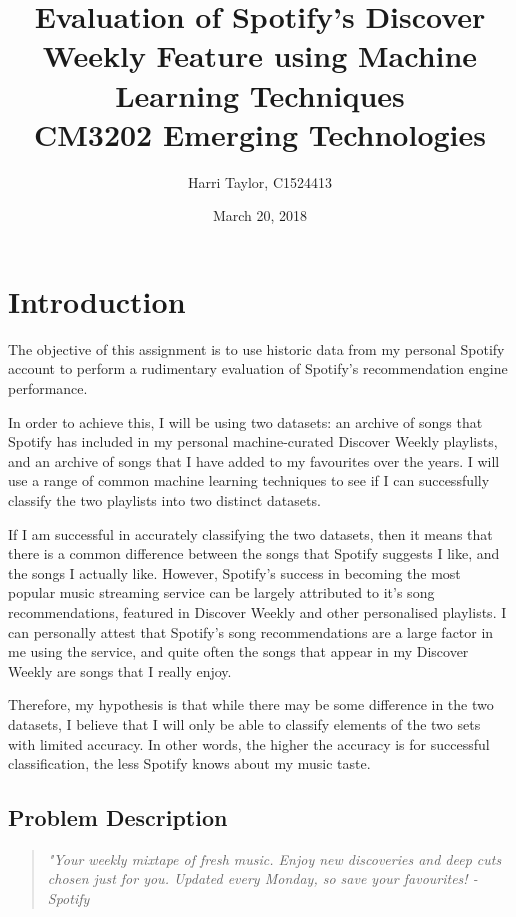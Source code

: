 \documentclass{article}
\title{
	Evaluation of Spotify's Discover Weekly Feature using Machine Learning Techniques \\ 
	\large CM3202 Emerging Technologies
	}
\author{Harri Taylor, C1524413}
\date{March 20, 2018}
\begin{document}
	\maketitle
	\newpage
	
	\section{Introduction}
	
	The objective of this assignment is to use historic data from my personal Spotify account to perform a rudimentary evaluation of Spotify's recommendation engine performance. 
	
	In order to achieve this, I will be using two datasets: an archive of songs that Spotify has included in my personal machine-curated Discover Weekly playlists, and an archive of songs that I have added to my favourites over the years. I will use a range of common machine learning techniques to see if I can successfully classify the two playlists into two distinct datasets. 
	
	If I am successful in accurately classifying the two datasets, then it means that there is a common difference between the songs that Spotify suggests I like, and the songs I actually like. However, Spotify's success in becoming the most popular music streaming service can be largely attributed to it's song recommendations, featured in Discover Weekly and other personalised playlists. I can personally attest that Spotify's song recommendations are a large factor in me using the service, and quite often the songs that appear in my Discover Weekly are songs that I really enjoy. 
	
	Therefore, my hypothesis is that while there may be some difference in the two datasets, I believe that I will only be able to classify elements of the two sets with limited accuracy. In other words, the higher the accuracy is for successful classification, the less Spotify knows about my music taste.
	
		\subsection{Problem Description}
		\begin{quotation}
		\textit{"Your weekly mixtape of fresh music. Enjoy new discoveries and deep cuts chosen just for you. Updated every Monday, so save your favourites! - \emph{Spotify}}
		\end{quotation}
		
\end{document}
